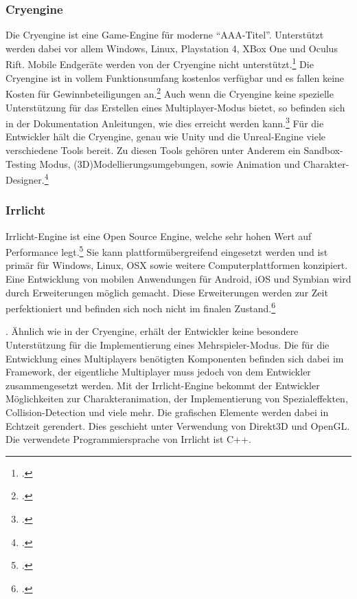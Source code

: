 	\subsubsection*{Cryengine}
	Die Cryengine ist eine Game-Engine für moderne \enquote{AAA-Titel}. Unterstützt werden dabei vor allem Windows, Linux, Playstation 4, XBox One und Oculus Rift. Mobile Endgeräte werden von der Cryengine nicht unterstützt.\footcite[\url{https://www.cryengine.com/features/platforms}]{cry-home} Die Cryengine ist in vollem Funktionsumfang kostenlos verfügbar und es fallen keine Kosten für Gewinnbeteiligungen an.\footcite[\url{https://www.cryengine.com/features}]{cry-home} Auch wenn die Cryengine keine spezielle Unterstützung für das Erstellen eines Multiplayer-Modus bietet, so befinden sich in der Dokumentation Anleitungen, wie dies erreicht werden kann.\footcite[\url{http://docs.cryengine.com/display/SDKDOC2/Multiplayer}]{cry-home} Für die Entwickler hält die Cryengine, genau wie Unity und die Unreal-Engine viele verschiedene Tools bereit. Zu diesen Tools gehören unter Anderem ein Sandbox-Testing Modus, (3D)Modellierungsumgebungen, sowie Animation und Charakter-Designer.\footcite[\url{https://www.cryengine.com/features}]{cry-home}

	\subsubsection*{Irrlicht}
	Irrlicht-Engine ist eine Open Source Engine, welche sehr hohen Wert auf Performance legt.\footcite[\url{http://irrlicht.sourceforge.net/}]{irrlicht-home} Sie kann plattformübergreifend eingesetzt werden und ist primär für Windows, Linux, OSX sowie weitere Computerplattformen konzipiert. Eine Entwicklung von mobilen Anwendungen für Android, iOS und Symbian wird durch Erweiterungen möglich gemacht. Diese Erweiterungen werden zur Zeit perfektioniert und befinden sich noch nicht im finalen Zustand.\footcite[\url{http://irrlicht.sourceforge.net/?page\_id=45}]{irrlicht-home}. Ähnlich wie in der Cryengine, erhält der Entwickler keine besondere Unterstützung für die Implementierung eines Mehrspieler-Modus. Die für die Entwicklung eines Multiplayers benötigten Komponenten befinden sich dabei im Framework, der eigentliche Multiplayer muss jedoch von dem Entwickler zusammengesetzt werden.\footnotemark{} Mit der Irrlicht-Engine bekommt der Entwickler Möglichkeiten zur Charakteranimation, der Implementierung von Spezialeffekten, Collision-Detection und viele mehr. Die grafischen Elemente werden dabei in Echtzeit gerendert. Dies geschieht unter Verwendung von Direkt3D und OpenGL. Die verwendete Programmiersprache von Irrlicht ist C++.\footnotemark{}

